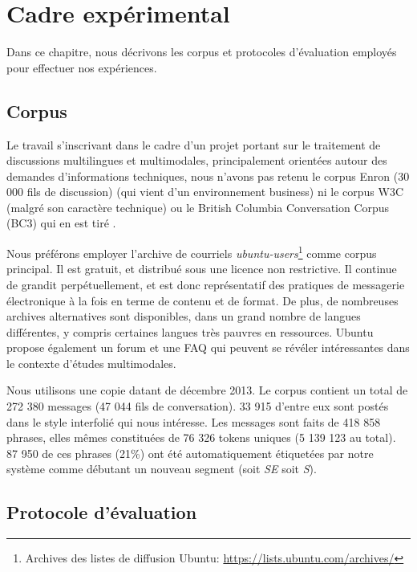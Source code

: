 
\chapter{Cadre expérimental}

\label{ch:experimental_framework}

Dans ce chapitre, nous décrivons les corpus et protocoles d'évaluation employés pour effectuer nos expériences.

\section{Corpus}

Le travail s'inscrivant dans le cadre d'un projet portant sur le traitement de discussions multilingues et multimodales, principalement orientées autour des demandes d'informations techniques, nous n'avons pas retenu le corpus Enron (30 000 fils de discussion) \cite{klimt:2004:enron} (qui vient d'un environnement business) ni le corpus W3C (malgré son caractère technique) ou le British Columbia Conversation Corpus (BC3) qui en est tiré \cite{ulrich:2008:bc3}.

Nous préférons employer l'archive de courriels \textit{ubuntu-users}\footnote{Archives des listes de diffusion Ubuntu: \url{https://lists.ubuntu.com/archives/}} comme corpus principal. Il est gratuit, et distribué sous une licence non restrictive. Il continue de grandit perpétuellement, et est donc représentatif des pratiques de messagerie électronique à la fois en terme de contenu et de format. De plus, de nombreuses archives alternatives sont disponibles, dans un grand nombre de langues différentes, y compris certaines langues très pauvres en ressources. Ubuntu propose également un forum et une FAQ qui peuvent se révéler intéressantes dans le contexte d'études multimodales.

Nous utilisons une copie datant de décembre 2013. Le corpus contient un total de 272 380 messages (47 044 fils de conversation). 33 915 d'entre eux sont postés dans le style interfolié qui nous intéresse. Les messages sont faits de 418 858 phrases, elles mêmes constituées de 76 326 tokens uniques (5 139 123 au total). 87 950 de ces phrases (21\%) ont été automatiquement étiquetées par notre système comme débutant un nouveau segment (soit \textit{SE} soit \textit{S}).

\section{Protocole d'évaluation}

